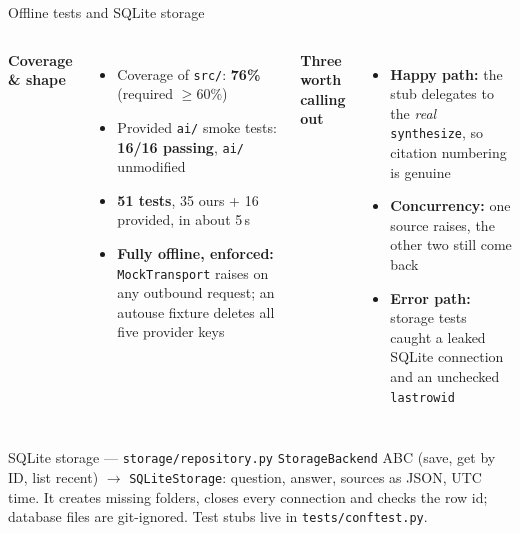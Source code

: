 \documentclass[aspectratio=169,11pt]{beamer}
\begin{document}
\begin{frame}{Offline tests and SQLite storage}
  \begin{columns}[T,onlytextwidth]
  \textbf{Coverage \& shape}
  \begin{itemize}\setlength\itemsep{0.25em}
    \item {\small Coverage of \texttt{src/}: \textbf{76\%} (required $\ge 60\%$)}
    \item {\small Provided \texttt{ai/} smoke tests: \textcolor{ok}{\textbf{16/16 passing}}, \texttt{ai/} unmodified}
    \item {\small \textbf{51 tests}, 35 ours + 16 provided, in about 5\,s}
    \item {\small \textbf{Fully offline, enforced:} \texttt{MockTransport} raises on any outbound
      request; an autouse fixture deletes all five provider keys}
  \end{itemize}

  \textbf{Three worth calling out}
  \begin{itemize}\setlength\itemsep{0.25em}
    \item {\small \textbf{Happy path:} the stub delegates to the \emph{real} \texttt{synthesize},
      so citation numbering is genuine}
    \item {\small \textbf{Concurrency:} one source raises, the other two still come back}
    \item {\small \textbf{Error path:} storage tests caught a leaked SQLite connection and an
      unchecked \texttt{lastrowid}}
  \end{itemize}
  \end{columns}

  \vspace{0.5em}
  \begin{block}{SQLite storage --- \texttt{storage/repository.py}}
    \small \texttt{StorageBackend} ABC (save, get by ID, list recent) $\to$ \texttt{SQLiteStorage}: question,
    answer, sources as JSON, UTC time. It creates missing folders, closes every connection and checks the
    row id; database files are git-ignored. Test stubs live in \texttt{tests/conftest.py}.
  \end{block}
\end{frame}
\end{document}
